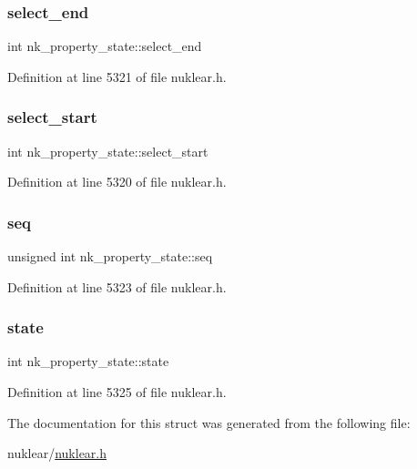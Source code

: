 \subsubsection{\texorpdfstring{select\+\_\+end}{select\_end}}
{\footnotesize\ttfamily int nk\+\_\+property\+\_\+state\+::select\+\_\+end}



Definition at line 5321 of file nuklear.\+h.

\mbox{\label{structnk__property__state_a5a6dca290782c4691a70948aa6a2d403}} 
\subsubsection{\texorpdfstring{select\+\_\+start}{select\_start}}
{\footnotesize\ttfamily int nk\+\_\+property\+\_\+state\+::select\+\_\+start}



Definition at line 5320 of file nuklear.\+h.

\mbox{\label{structnk__property__state_a17a7408517599a09e6244421b2f06f9b}} 
\subsubsection{\texorpdfstring{seq}{seq}}
{\footnotesize\ttfamily unsigned int nk\+\_\+property\+\_\+state\+::seq}



Definition at line 5323 of file nuklear.\+h.

\mbox{\label{structnk__property__state_acb8b93d0b35c75577a73362e05617259}} 
\subsubsection{\texorpdfstring{state}{state}}
{\footnotesize\ttfamily int nk\+\_\+property\+\_\+state\+::state}



Definition at line 5325 of file nuklear.\+h.



The documentation for this struct was generated from the following file\+:\begin{DoxyCompactItemize}
\item 
nuklear/\mbox{\hyperlink{nuklear_8h}{nuklear.\+h}}\end{DoxyCompactItemize}
